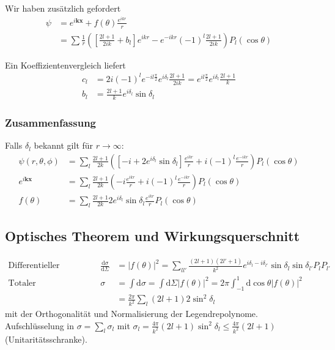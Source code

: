 \documentclass[11pt,a4paper]{report}
\begin{document}
Wir haben zusätzlich gefordert
\begin{align*}
    \psi &= e^{i \mathbf{k} \mathbf{x}} + f(\theta) \frac{e^{i k r}}{r} \\
    &= \sum \frac{1}{r} \left(\left[ \frac{2 l + 1}{2 i k} + b_l \right] e^{i k r} - e^{-i k r} (-1)^l \frac{2 l + 1} {2 i k}\right) P_l(\cos \theta)
\end{align*}

Ein Koeffizientenvergleich liefert 
\begin{align*}
    c_l &= 2 i (-1)^l e^{-i l \frac{\pi}{2}} e^{i \delta_l} \frac{2 l + 1}{2 i k} = e^{i l \frac{\pi}{2}} e^{i \delta_l} \frac{2 l + 1}{k} \\
    b_l &= \frac{2 l + 1}{k} e^{i \delta_l} \sin \delta_l
\end{align*}

\subsubsection{Zusammenfassung}

Falls $\delta_l$ bekannt gilt für $r \rightarrow \infty$:
\begin{align*}
    \psi(r, \theta, \phi) &= \sum_l \frac{2 l + 1}{2 k} \left( \left[ -i + 2 e^{i \delta_l} \sin \delta_l \right] \frac{e^{i k r}}{r} + i (-1)^l \frac{e^{-i k r}}{r}\right) P_l(\cos \theta) \\
    e^{i \mathbf{k} \mathbf{x}} &= \sum_l \frac{2 l + 1}{2 k} \left( -i \frac{e^{i k r}}{r} + i (-1)^l \frac{e^{-i k r}}{r}\right) P_l(\cos \theta) \\
    f(\theta) &= \sum_l \frac{2 l + 1}{2 k} 2 e^{i \delta_l} \sin \delta_l \frac{e^{i k r}}{r}  P_l(\cos \theta) 
\end{align*}

\subsection{Optisches Theorem und Wirkungsquerschnitt}

\begin{align*}
    \text{Differentieller Wirkungsquerschnitt} && \frac{\mathrm{d} \sigma}{\mathrm{d} \Sigma} &= |f(\theta)|^2 = \sum_{l l'} \frac{(2 l + 1)(2 l' + 1)}{k^2} e^{i \delta_l - i \delta_{l'}} \sin \delta_l \sin \delta_{l'} P_l P_{l'} \\
    \text{Totaler Wirkungsquerschnitt} && \sigma &= \int \mathrm{d}\sigma = \int \mathrm{d} \Sigma |f(\theta)|^2 = 2\pi \int_{-1}^1 \mathrm{d}\cos \theta |f(\theta)|^2 \\
    &&&=\frac{2\pi}{k^2} \sum_l (2 l + 1) 2 \sin^2 \delta_l 
\end{align*}
mit der Orthogonalität und Normalisierung der Legendrepolynome.
Aufschlüsselung in $\sigma = \sum_l \sigma_l$ mit $\sigma_l = \frac{4\pi}{k^2} (2 l + 1) \sin^2  \delta_l \leq \frac{4\pi}{k^2} (2 l + 1)$ (Unitaritätsschranke).
\end{document}
